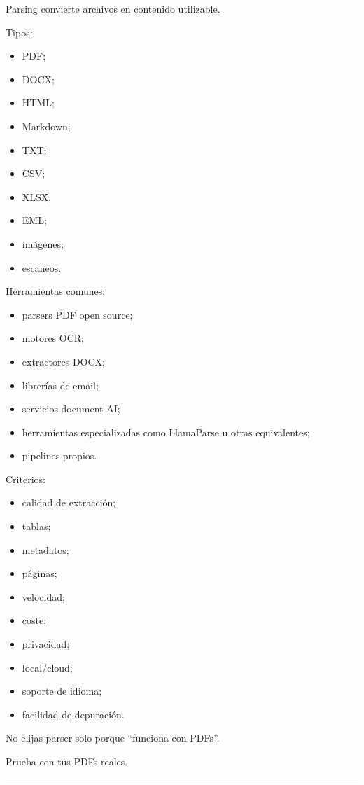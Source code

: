 Parsing convierte archivos en contenido utilizable.

Tipos:

\begin{itemize}
\tightlist
\item
  PDF;
\item
  DOCX;
\item
  HTML;
\item
  Markdown;
\item
  TXT;
\item
  CSV;
\item
  XLSX;
\item
  EML;
\item
  imágenes;
\item
  escaneos.
\end{itemize}

Herramientas comunes:

\begin{itemize}
\tightlist
\item
  parsers PDF open source;
\item
  motores OCR;
\item
  extractores DOCX;
\item
  librerías de email;
\item
  servicios document AI;
\item
  herramientas especializadas como LlamaParse u otras equivalentes;
\item
  pipelines propios.
\end{itemize}

Criterios:

\begin{itemize}
\tightlist
\item
  calidad de extracción;
\item
  tablas;
\item
  metadatos;
\item
  páginas;
\item
  velocidad;
\item
  coste;
\item
  privacidad;
\item
  local/cloud;
\item
  soporte de idioma;
\item
  facilidad de depuración.
\end{itemize}

No elijas parser solo porque ``funciona con PDFs''.

Prueba con tus PDFs reales.

\begin{center}\rule{0.5\linewidth}{0.5pt}\end{center}

